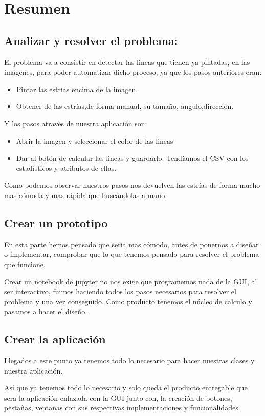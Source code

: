 \section{Resumen}

\subsection{Analizar y resolver el problema:}
El problema va a consistir en detectar las lineas que tienen ya pintadas, en las imágenes, para poder automatizar dicho proceso, ya que los pasos anteriores eran:
\begin{itemize}
\item Pintar las estrías encima de la imagen.
\item Obtener de las estrías,de forma manual, su tamaño, angulo,dirección.
\end{itemize}
Y los pasos através de nuestra aplicación son:
\begin{itemize}
\item Abrir la imagen y seleccionar el color de las lineas
\item Dar al botón de calcular las lineas y guardarlo: Tendíamos el CSV con los estadísticos y atributos de ellas.
\end{itemize}
Como podemos observar nuestros pasos nos devuelven las estrías de forma mucho mas cómoda y mas rápida que buscándolas a mano.

\subsection{Crear un prototipo} 
En esta parte hemos pensado que seria mas cómodo, antes de ponernos a diseñar o implementar, comprobar que lo que tenemos pensado para resolver el problema que funcione.

Crear un notebook de jupyter no nos exige que programemos nada de la GUI, al ser interactivo, fuimos haciendo todos los pasos necesarios para resolver el problema y una vez conseguido. Como producto tenemos el núcleo de calculo y pasamos a hacer el diseño.

\subsection{Crear la aplicación}
Llegados a este punto ya tenemos todo lo necesario para hacer nuestras clases y nuestra aplicación.

Así que ya tenemos todo lo necesario y solo queda el producto entregable que sera la aplicación enlazada con la GUI junto con, la creación de botones, pestañas, ventanas con sus respectivas implementaciones y funcionalidades.